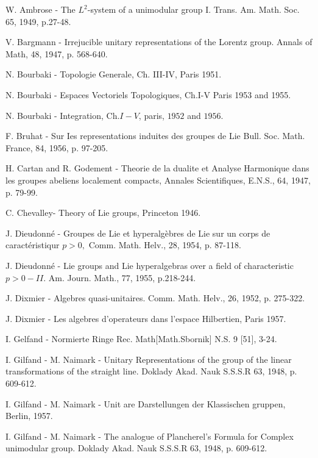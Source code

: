 \begin{thebibliography}{99}
  W. Ambrose  -  The $L^2$-system of a unimodular group I.
   Trans. Am. Math. Soc. 65, 1949, p.27-48.

  V. Bargmann  - Irrejucible unitary representations of the
   Lorentz group.   Annals of Math, 48, 1947, p. 568-640.

  N. Bourbaki  -  Topologie Generale, Ch. III-IV, Paris 1951.

 N. Bourbaki  -  Espaces Vectoriels Topologiques, Ch.I-V
   Paris 1953 and 1955.

 N. Bourbaki  -  Integration, Ch.$I-V$, paris, $1952$ and $1956$.

 F. Bruhat  -   Sur Ies representations induites des groupes de
    Lie
    Bull. Soc. Math. France, 84, 1956, p. 97-205.

 H. Cartan and R. Godement  -  Theorie de la dualite et
  Analyse Harmonique 
    dans les groupes abeliens localement compacts,
    Annales Scientifiques, E.N.S., 64, 1947, p. 79-99.

 C. Chevalley\pageoriginale  -  Theory of Lie groups, 
  Princeton 1946. 

 J. Dieudonn\'e  -   Groupes de Lie et hyperalg\`ebres de Lie sur 
                          un corps de caract\'eristiqur $p > 0,$   
                          Comm. Math. Helv., 28, 1954, p. 87-118.

 J. Dieudonn\'e  -  Lie groups and Lie hyperalgebras over a 
     field of characteristic $p > 0-II$.
     Am. Journ. Math., 77, 1955, p.218-244.

 J. Dixmier  -  Algebres quasi-unitaires.
     Comm. Math. Helv., 26, 1952, p. 275-322.

 J. Dixmier  -   Les algebres d'operateurs dans l'espace 
      Hilbertien, Paris 1957.

 I. Gelfand  -   Normierte Ringe
      Rec. Math[Math.Sbornik] N.S. 9 [51], 3-24.

 I. Gilfand - M. Naimark    -  Unitary Representations of the
  group of the linear transformations of the straight line.
        Doklady Akad. Nauk S.S.S.R 63, 1948, p. 609-612.

 I. Gilfand - M. Naimark  -  Unit are Darstellungen der Klassischen 
        gruppen, Berlin, 1957.

 I. Gilfand - M. Naimark  -   The analogue of
  Plancherel's Formula for  Complex unimodular group.    
         Doklady Akad. Nauk S.S.S.R 63, 1948, p. 609-612.


\end{thebibliography}
